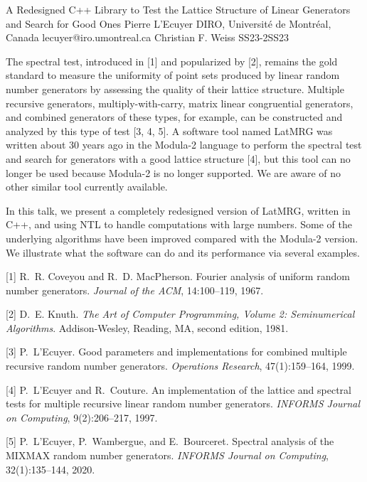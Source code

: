 \begin{talk}
  {A Redesigned C++ Library to Test the Lattice Structure of Linear Generators
	 and Search for Good Ones}%
  {Pierre L'Ecuyer}%
  {DIRO, Universit\'e de Montr\'eal, Canada}%
  {lecuyer@iro.umontreal.ca}%
  {Christian F. Weiss}%
{}{}{SS23-2}{SS23}


The spectral test, introduced in [1] and popularized by [2], 
remains the gold standard to measure the uniformity of point sets 
produced by linear random number generators by assessing the quality of their lattice structure.
Multiple recursive generators, multiply-with-carry, matrix linear congruential generators, 
and combined generators of these types, for example, can be constructed and analyzed 
by this type of test [3, 4, 5].  
A software tool named LatMRG was written about 30 years ago in the Modula-2 language 
to perform the spectral test and search for generators with a good lattice structure [4],
but this tool can no longer be used because Modula-2 is no longer supported. 
We are aware of no other similar tool currently available.

In this talk, we present a completely redesigned version of LatMRG, written in C++,
and using NTL to handle computations with large numbers. 
Some of the underlying algorithms have been improved compared with the Modula-2 version.
We illustrate what the software can do and its performance via several examples.

\medskip

[1] R.~R. Coveyou and R.~D. MacPherson.
Fourier analysis of uniform random number generators.
{\em Journal of the ACM}, 14:100--119, 1967.

[2] D.~E. Knuth.
{\em The Art of Computer Programming, Volume 2: Seminumerical Algorithms}.
Addison-Wesley, Reading, MA, second edition, 1981.

[3] P.~L'Ecuyer.
Good parameters and implementations for combined multiple recursive
  random number generators.
{\em Operations Research}, 47(1):159--164, 1999.

[4] P.~L'Ecuyer and R.~Couture.
An implementation of the lattice and spectral tests for multiple
  recursive linear random number generators.
{\em INFORMS Journal on Computing}, 9(2):206--217, 1997.

[5] P.~L'Ecuyer, P.~Wambergue, and E.~Bourceret.
Spectral analysis of the {MIXMAX} random number generators.
{\em INFORMS Journal on Computing}, 32(1):135--144, 2020.
%
\end{talk}

